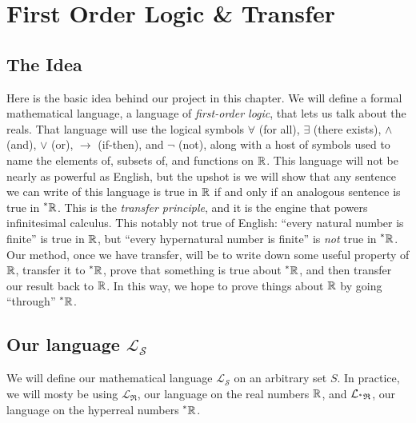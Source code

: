 \section{First Order Logic \& Transfer}
\subsection{The Idea}
Here is the basic idea behind our project in this chapter. We will define a formal mathematical language, a language of \textit{first-order logic}, that lets us talk about the reals. That language will use the logical symbols $\forall$ (for all), $\exists$ (there exists), $\land$ (and), $\lor$ (or), $\to$ (if-then), and $\neg$ (not), along with a host of symbols used to name the elements of, subsets of, and functions on $\mathbb{R}$. This language will not be nearly as powerful as English, but the upshot is we will show that any sentence we can write of this language is true in $\mathbb{R}$ if and only if an analogous sentence is true in $\prescript{*}{}{\mathbb{R}}$. This is the \textit{transfer principle}, and it is the engine that powers infinitesimal calculus. This notably not true of English: ``every natural number is finite'' is true in $\mathbb{R}$, but ``every hypernatural number is finite'' is \textit{not} true in $\prescript{*}{}{\mathbb{R}}$. Our method, once we have transfer, will be to write down some useful property of $\mathbb{R}$, transfer it to $\prescript{*}{}{\mathbb{R}}$, prove that something is true about $\prescript{*}{}{\mathbb{R}}$, and then transfer our result back to $\mathbb{R}$. In this way, we hope to prove things about $\mathbb{R}$ by going ``through'' $\prescript{*}{}{\mathbb{R}}$.

\subsection{Our language \texorpdfstring{$\mathcal{L}_\mathscr{S}$}{L S}}
We will define our mathematical language $\mathcal{L}_\mathscr{S}$ on an arbitrary set $S$. In practice, we will mosty be using $\mathcal{L}_\mathfrak{R}$, our language on the real numbers $\mathbb{R}$, and $\mathcal{L}_{\prescript{*}{}{\mathfrak{R}}}$, our language on the hyperreal numbers $\prescript{*}{}{\mathbb{R}}$.

